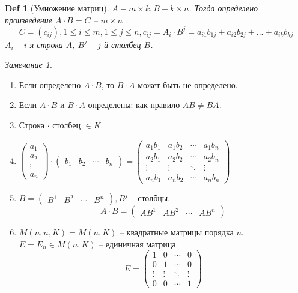 \documentclass[12pt]{article}
\newenvironment{MyList}[1][4pt]{
  \begin{enumerate}[1.]
  \setlength{\parskip}{0pt}
  \setlength{\itemsep}{#1}
}{       
  \end{enumerate}
}
\theoremstyle{definition} %
\theoremstyle{plain} %
\newtheorem{Def}[Thm]{Def} %
\theoremstyle{remark} %
\newtheorem{Rem}[Thm]{Замечание} %
\begin{document}
{\begin{Def}[Умножение матриц]
    $A - m \times k, B - k \times n$. Тогда определено произведение $A \cdot B = C$ -- $m \times n$ .
    \[C = (c_{ij}), {1 \leqslant i \leqslant m, 1 \leqslant j \leqslant n}, c_{ij} = A_i \cdot B^j = a_{i1} b_{1j} + a_{i2} b_{2j} + ... + a_{ik} b_{kj}\]
    $A_i$ -- $i$-я строка $A$, $B^j$ -- $j$-й столбец $B$.
\end{Def}

\begin{Rem}
    \begin{MyList}
        \item Если определено $A \cdot B$, то $B \cdot A$ может быть не определено.
        \item Если $A \cdot B$ и $B \cdot A$ определены: как правило $AB \neq BA$.
        \item Строка $\cdot$ столбец $\in K$.
        \item $\left(\begin{array}{c}
        a_1 \\ 
        a_2 \\ 
        \vdots \\ 
        a_n
        \end{array}\right) \cdot \left(\begin{array}{cccc}
        b_1 & b_2 & \cdots & b_n
        \end{array}\right) = \left(\begin{array}{cccc}
        a_1b_1 & a_1b_2 & \cdots & a_1b_n \\ 
        a_2b_1 & a_2b_2 & \cdots & a_2b_n \\ 
        \vdots & \vdots & \ddots & \vdots \\ 
        a_nb_1 & a_nb_2 & \cdots & a_nb_n
        \end{array}\right)$ 

        \item $B = \left(\begin{array}{cccc}
        B^1 & B^2 & \cdots & B^n
        \end{array}\right), B^j$ -- столбцы.
        \[A \cdot B = \left(\begin{array}{cccc}
        AB^1 & AB^2 & \cdots & AB^n
        \end{array}\right)\]

        \item $M(n, n, K) = M(n, K)$ -- квадратные матрицы порядка $n$. $E = E_n \in M(n, K)$ -- единичная матрица.
        \[E = \left(\begin{array}{cccc}
        1 & 0 & \cdots & 0 \\ 
        0 & 1 & \cdots & 0 \\ 
        \vdots & \vdots & \ddots & \vdots \\ 
        0 & 0 & \cdots & 1
        \end{array}\right)\]
    \end{MyList}
\end{Rem}

}
\end{document}
